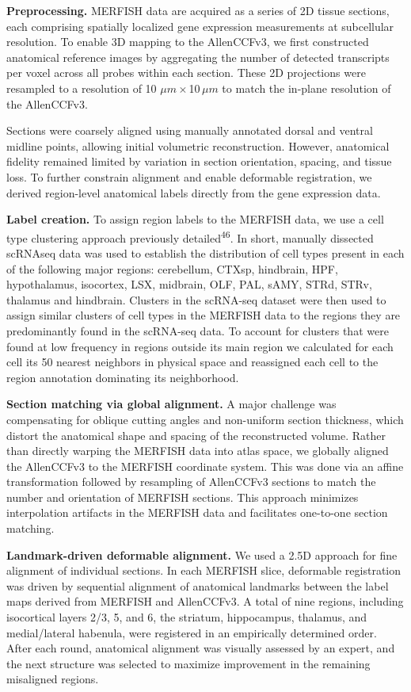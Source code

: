 \documentclass[
  12pt,
]{article}
\begin{document}
\textbf{Preprocessing.} MERFISH data are acquired as a series of 2D
tissue sections, each comprising spatially localized gene expression
measurements at subcellular resolution. To enable 3D mapping to the
AllenCCFv3, we first constructed anatomical reference images by
aggregating the number of detected transcripts per voxel across all
probes within each section. These 2D projections were resampled to a
resolution of 10 \(\mu m\)\,\(\times\)\,10\,\(\mu m\) to match the
in-plane resolution of the AllenCCFv3.

Sections were coarsely aligned using manually annotated dorsal and
ventral midline points, allowing initial volumetric reconstruction.
However, anatomical fidelity remained limited by variation in section
orientation, spacing, and tissue loss. To further constrain alignment
and enable deformable registration, we derived region-level anatomical
labels directly from the gene expression data.

\textbf{Label creation.} To assign region labels to the MERFISH data, we
use a cell type clustering approach previously
detailed\textsuperscript{46}. In short, manually dissected scRNAseq data
was used to establish the distribution of cell types present in each of
the following major regions: cerebellum, CTXsp, hindbrain, HPF,
hypothalamus, isocortex, LSX, midbrain, OLF, PAL, sAMY, STRd, STRv,
thalamus and hindbrain. Clusters in the scRNA-seq dataset were then used
to assign similar clusters of cell types in the MERFISH data to the
regions they are predominantly found in the scRNA-seq data. To account
for clusters that were found at low frequency in regions outside its
main region we calculated for each cell its 50 nearest neighbors in
physical space and reassigned each cell to the region annotation
dominating its neighborhood.

\textbf{Section matching via global alignment.} A major challenge was
compensating for oblique cutting angles and non-uniform section
thickness, which distort the anatomical shape and spacing of the
reconstructed volume. Rather than directly warping the MERFISH data into
atlas space, we globally aligned the AllenCCFv3 to the MERFISH
coordinate system. This was done via an affine transformation followed
by resampling of AllenCCFv3 sections to match the number and orientation
of MERFISH sections. This approach minimizes interpolation artifacts in
the MERFISH data and facilitates one-to-one section matching.

\textbf{Landmark-driven deformable alignment.} We used a 2.5D approach
for fine alignment of individual sections. In each MERFISH slice,
deformable registration was driven by sequential alignment of anatomical
landmarks between the label maps derived from MERFISH and AllenCCFv3. A
total of nine regions, including isocortical layers 2/3, 5, and 6, the
striatum, hippocampus, thalamus, and medial/lateral habenula, were
registered in an empirically determined order. After each round,
anatomical alignment was visually assessed by an expert, and the next
structure was selected to maximize improvement in the remaining
misaligned regions.
\end{document}
